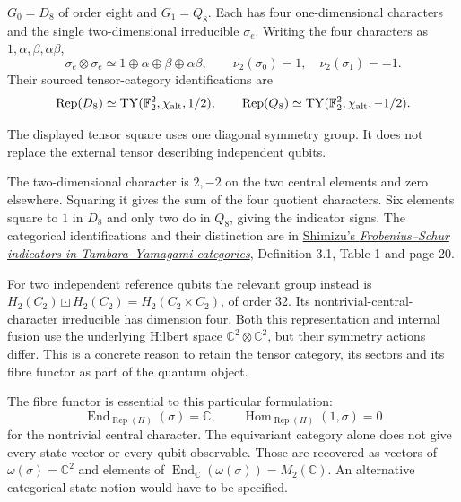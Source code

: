 \begin{proposition}
{\normalfont\statusSketch}\quad $G_0=D_8$ of order eight and $G_1=Q_8$. Each has four
one-dimensional characters and the single two-dimensional irreducible
$\sigma_e$. Writing the four characters as $1,\alpha,\beta,\alpha\beta$,
\[
\sigma_e\otimes\sigma_e\simeq
1\oplus\alpha\oplus\beta\oplus\alpha\beta,\qquad
\nu_2(\sigma_0)=1,\quad\nu_2(\sigma_1)=-1.
\]
Their sourced tensor-category identifications are
\[
\operatorname{Rep}(D_8)\simeq\mathrm{TY}(\mathbb F_2^2,\chi_{\rm alt},1/2),
\qquad
\operatorname{Rep}(Q_8)\simeq\mathrm{TY}(\mathbb F_2^2,\chi_{\rm alt},-1/2).
\]
\end{proposition}
\begin{scope}The displayed tensor square uses one diagonal symmetry
group. It does not replace the external tensor describing independent qubits.\end{scope}

The two-dimensional character is $2,-2$ on the two central elements and
zero elsewhere. Squaring it gives the sum of the four quotient characters.
Six elements square to $1$ in $D_8$ and only two do in $Q_8$, giving the
indicator signs. The categorical identifications and their distinction
are in \href{https://arxiv.org/abs/1005.4500}{Shimizu's
\emph{Frobenius--Schur indicators in Tambara--Yamagami categories}},
Definition 3.1, Table 1 and page 20.

For two independent reference qubits the relevant group instead is
$H_2(C_2)\boxdot H_2(C_2)=H_2(C_2\times C_2)$, of order 32.
Its nontrivial-central-character irreducible has dimension four.
Both this representation and internal fusion use the underlying Hilbert
space $\mathbb C^2\otimes\mathbb C^2$, but their symmetry actions differ.
This is a concrete reason to retain the tensor category, its sectors and
its fibre functor as part of the quantum object.

The fibre functor is essential to this particular formulation:
\[
\operatorname{End}_{\operatorname{Rep}(H)}(\sigma)=\mathbb C,\qquad
\operatorname{Hom}_{\operatorname{Rep}(H)}(1,\sigma)=0
\]
for the nontrivial central character. The equivariant category alone does not give every
state vector or every qubit observable. Those are recovered as vectors
of $\omega(\sigma)=\mathbb C^2$ and elements of
$\operatorname{End}_{\mathbb C}(\omega(\sigma))=M_2(\mathbb C)$.
An alternative categorical state notion would have to be specified.

